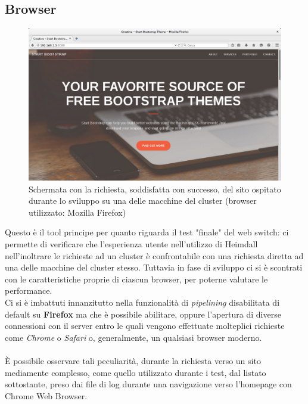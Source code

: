 \documentclass[italian]{tktltiki2}
\begin{document}
\subsection{Browser}
\begin{figure}[h]
\centering
\includegraphics[width=\textwidth]{images/screen_browser}
\caption{Schermata con la richiesta, soddisfatta con successo, del sito ospitato durante lo sviluppo su una delle macchine del cluster (browser utilizzato: Mozilla Firefox)}
\end{figure}
Questo è il tool principe per quanto riguarda il test "finale" del web switch: ci permette di verificare che l'esperienza utente nell'utilizzo di Heimdall nell'inoltrare le richieste ad un cluster è confrontabile con una richiesta diretta ad una delle macchine del cluster stesso. Tuttavia in fase di sviluppo ci si è scontrati con le caratteristiche proprie di ciascun browser, per poterne valutare le performance. \\
Ci si è imbattuti innanzitutto nella funzionalità di \emph{pipelining} disabilitata di default su \textbf{Firefox}\cite{firefox} ma che è possibile abilitare, oppure l'apertura di diverse connessioni con il server entro le quali vengono effettuate molteplici richieste come \emph{Chrome}\cite{chrome} o \emph{Safari}\cite{apple} o, generalmente, un qualsiasi browser moderno. \\\\
È possibile osservare tali peculiarità, durante la richiesta verso un sito mediamente complesso, come quello utilizzato durante i test, dal listato sottostante, preso dai file di log durante una navigazione verso l'homepage con Chrome Web Browser.
\end{document}
